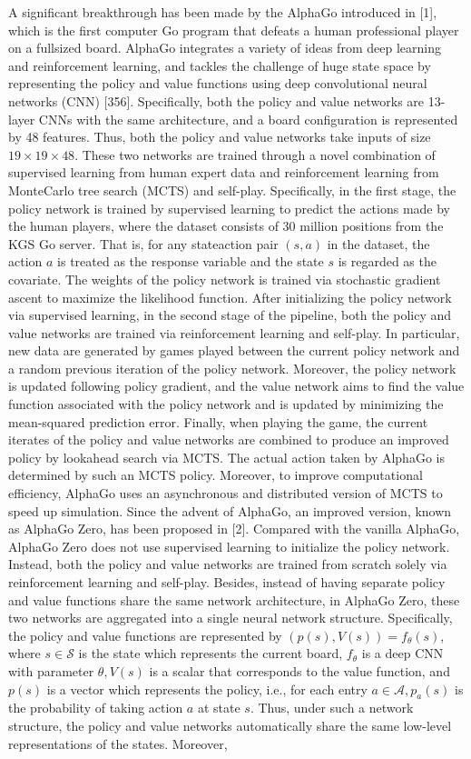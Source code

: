 \documentclass[10pt]{article}
\begin{document}
A significant breakthrough has been made by the AlphaGo introduced in [1], which is the first computer Go program that defeats a human professional player on a fullsized board. AlphaGo integrates a variety of ideas from deep learning and reinforcement learning, and tackles the challenge of huge state space by representing the policy and value functions using deep convolutional neural networks (CNN) [356]. Specifically, both the policy and value networks are 13-layer CNNs with the same architecture, and a board configuration is represented by 48 features. Thus, both the policy and value networks take inputs of size $19 \times 19 \times 48$. These two networks are trained through a novel combination of supervised learning from human expert data and reinforcement learning from MonteCarlo tree search (MCTS) and self-play. Specifically, in the first stage, the policy network is trained by supervised learning to predict the actions made by the human players, where the dataset consists of 30 million positions from the KGS Go server. That is, for any stateaction pair $(s, a)$ in the dataset, the action $a$ is treated as the response variable and the state $s$ is regarded as the covariate. The weights of the policy network is trained via stochastic gradient ascent to maximize the likelihood function. After initializing the policy network via supervised learning, in the second stage of the pipeline, both the policy and value networks are trained via reinforcement learning and self-play. In particular, new data are generated by games played between the current policy network and a random previous iteration of the policy network. Moreover, the policy network is updated following policy gradient, and the value network aims to find the value function associated with the policy network and is updated by minimizing the mean-squared prediction error. Finally, when playing the game, the current iterates of the policy and value networks are combined to produce an improved policy by lookahead search via MCTS. The actual action taken by AlphaGo is determined by such an MCTS policy. Moreover, to improve computational efficiency, AlphaGo uses an asynchronous and distributed version of MCTS to speed up simulation. Since the advent of AlphaGo, an improved version, known as AlphaGo Zero, has been proposed in [2]. Compared with the vanilla AlphaGo, AlphaGo Zero does not use supervised learning to initialize the policy network. Instead, both the policy and value networks are trained from scratch solely via reinforcement learning and self-play. Besides, instead of having separate policy and value functions share the same network architecture, in AlphaGo Zero, these two networks are aggregated into a single neural network structure. Specifically, the policy and value functions are represented by $(p(s), V(s))=f_{\theta}(s)$, where $s \in \mathcal{S}$ is the state which represents the current board, $f_{\theta}$ is a deep CNN with parameter $\theta, V(s)$ is a scalar that corresponds to the value function, and $p(s)$ is a vector which represents the policy, i.e., for each entry $a \in \mathcal{A}, p_{a}(s)$ is the probability of taking action $a$ at state $s$. Thus, under such a network structure, the policy and value networks automatically share the same low-level representations of the states. Moreover, 
\end{document}
